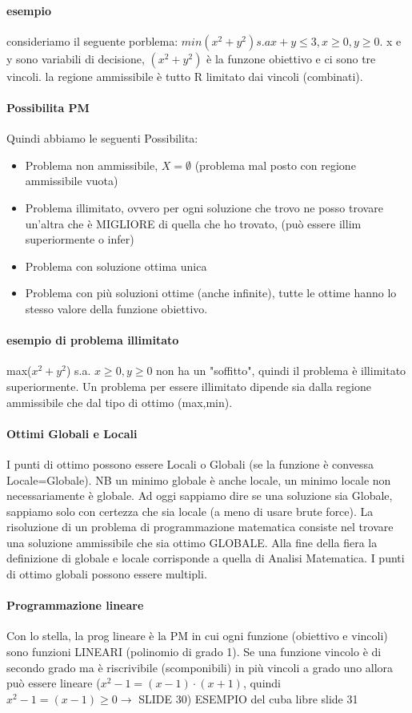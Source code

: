 \documentclass[12pt, a4paper, openany]{book}
\begin{document}
\paragraph*{esempio} consideriamo il seguente porblema: $min (x^2+y^2) s.a x+y\leq 3, x\geq 0, y\geq0$. 
x e y sono variabili di decisione, $(x^2+y^2)$ è la funzone obiettivo e ci sono tre vincoli. la regione ammissibile è tutto R limitato dai vincoli (combinati).
\paragraph*{Possibilita PM} Quindi abbiamo le seguenti Possibilita:
\begin{itemize}
    \item Problema non ammissibile, $X = \emptyset$ (problema mal posto con regione ammissibile vuota)
    \item Problema illimitato, ovvero per ogni soluzione che trovo ne posso trovare un'altra che è MIGLIORE di quella che ho trovato, (può essere illim superiormente o infer)
    \item Problema con soluzione ottima unica
    \item Problema con più soluzioni ottime (anche infinite), tutte le ottime hanno lo stesso valore della funzione obiettivo.
\end{itemize}
\paragraph*{esempio di problema illimitato } max($x^2+y^2$) s.a. $x\geq 0,y\geq 0$ non ha un "soffitto", quindi il problema è illimitato superiormente. Un problema per essere illimitato dipende sia dalla regione ammissibile che dal tipo di ottimo (max,min).


\paragraph*{Ottimi Globali e Locali} I punti di ottimo possono essere Locali o Globali (se la funzione è convessa Locale=Globale). NB un minimo globale è anche locale, un minimo locale non necessariamente è globale.
Ad oggi sappiamo dire se una soluzione sia Globale, sappiamo solo con certezza che sia locale (a meno di usare brute force).
La risoluzione di un problema di programmazione matematica consiste nel trovare una soluzione ammissibile che sia ottimo GLOBALE.
Alla fine della fiera la definizione di globale e locale corrisponde a quella di Analisi Matematica.
I punti di ottimo globali possono essere multipli.

\paragraph*{Programmazione lineare} Con lo stella, la prog lineare è la PM in cui ogni funzione (obiettivo e vincoli) sono funzioni LINEARI (polinomio di grado 1).
Se una funzione vincolo è di secondo grado ma è riscrivibile (scomponibili) in più vincoli a grado uno allora può essere lineare ($x^2-1 =(x-1) \cdot (x+1)$, quindi $x^2-1 =(x-1) \geq 0 \to $ {SLIDE 30})
{ESEMPIO del cuba libre slide 31}
\end{document}
